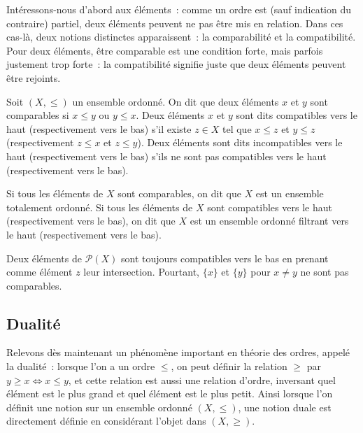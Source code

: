 Intéressons-nous d'abord aux éléments~: comme un ordre est (sauf indication du
contraire) partiel, deux éléments peuvent ne pas être mis en relation. Dans ces
cas-là, deux notions distinctes apparaissent~: la comparabilité et la
compatibilité. Pour deux éléments, être comparable est une condition forte,
mais parfois justement trop forte~: la compatibilité signifie juste que deux
éléments peuvent être rejoints.

\begin{definition}
  Soit $(X,\leq)$ un ensemble ordonné. On dit que deux éléments $x$ et $y$ sont
  comparables si $x\leq y$ ou $y\leq x$. Deux éléments $x$ et $y$ sont dits
  compatibles vers le haut (respectivement vers le bas) s'il existe $z \in X$
  tel que $x\leq z$ et $y\leq z$ (respectivement $z \leq x$ et $z \leq y$). Deux
  éléments sont dits incompatibles vers le haut (respectivement vers le bas)
  s'ils ne sont pas compatibles vers le haut (respectivement vers le bas).

  Si tous les éléments de $X$ sont comparables, on dit que $X$ est un ensemble
  totalement ordonné.
  Si tous les éléments de $X$ sont compatibles vers le haut (respectivement vers
  le bas), on dit que $X$ est un ensemble ordonné filtrant vers le haut
  (respectivement vers le bas).
\end{definition}

\begin{example}
  Deux éléments de $\mathcal P(X)$ sont toujours compatibles vers le bas en
  prenant comme élément $z$ leur intersection. Pourtant, $\{x\}$ et $\{y\}$ pour
  $x\neq y$ ne sont pas comparables.
\end{example}

\subsection{Dualité}

Relevons dès maintenant un phénomène important en théorie des ordres, appelé la
dualité~: lorsque l'on a un ordre $\leq$, on peut définir la relation $\geq$
par $y\geq x \iff x\leq y$, et cette relation est aussi une relation d'ordre,
inversant quel élément est le plus grand et quel élément est le plus petit.
Ainsi lorsque l'on définit une notion sur un ensemble ordonné $(X,\leq)$, une
notion duale est directement définie en considérant l'objet dans $(X,\geq)$.

